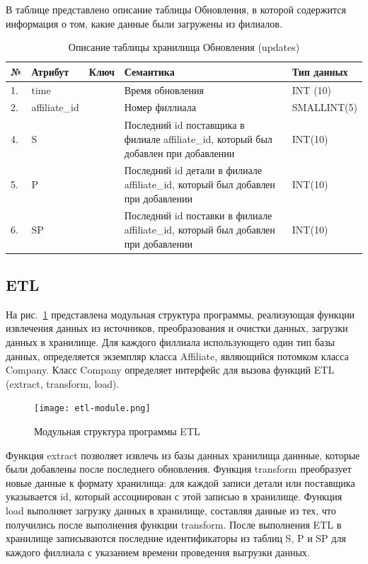 В таблице  представлено описание таблицы Обновления, в которой содержится информация о том, какие данные были загружены из филиалов.
\begin{table}[h]
	\caption{\space Описание таблицы хранилища Обновления (updates)}
	\label{etl-updates}
	\begin{tabular}{|p{0.4cm}|p{2.5cm}|p{1.5cm}|p{6.3cm}|p{3.2cm}|}
		\hline
		\textbf{№} & \textbf{Атрибут} & \textbf{Ключ} & \textbf{Семантика} & \textbf{Тип данных} \\
		\hline
		1. & time & & Время обновления & INT (10) \\
		\hline
		2. & affiliate\_id & & Номер филлиала & SMALLINT(5) \\
		\hline
		4. & S & & Последний id поставщика в филиале affiliate\_id, который был добавлен при добавлении & INT(10) \\
		\hline
		5. & P & & Последний id детали в филиале affiliate\_id, который был добавлен при добавлении & INT(10) \\
		\hline
		6. & SP & & Последний id поставки в филиале affiliate\_id, который был добавлен при добавлении & INT(10) \\
		\hline
	\end{tabular}
\end{table}

\subsection{ETL}
На рис.~\ref{etl-module} представлена модульная структура программы, реализующая функции извлечения данных из источников, преобразования и очистки данных, загрузки данных в хранилище. Для каждого филлиала использующего один тип базы данных, определяется экземпляр класса Affiliate, являющийся потомком класса Company. Класс Company определяет интерфейс для вызова функций ETL (extract, transform, load).\par
\begin{figure}[h]
  \centering
  \texttt{[image: etl-module.png]}
  \caption{Модульная структура программы ETL}
  \label{etl-module}
\end{figure}
Функция extract позволяет извлечь из базы данных хранилища даннные, которые были добавлены после последнего обновления. Функция transform преобразует новые данные к формату хранилища: для каждой записи детали или поставщика указывается id, который ассоциирован с этой записью в хранилище. Функция load выполняет загрузку данных в хранилище, составляя данные из тех, что получились после выполнения функции transform. После выполнения ETL в хранилище записываются последние идентификаторы из таблиц S, P и SP для каждого филлиала с указанием времени проведения выгрузки данных.


